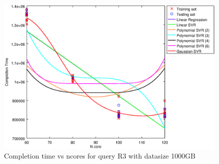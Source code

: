 
\begin {figure}[hbtp]
\centering
\includegraphics[width=\textwidth]{output/R3_1000_ONLY_1_LINEAR_NCORE/plot_R3_1000.eps}
\caption{Completion time vs ncores for query R3 with datasize 1000GB}
\label{fig:only_1_linear_R3_1000}
\end {figure}
